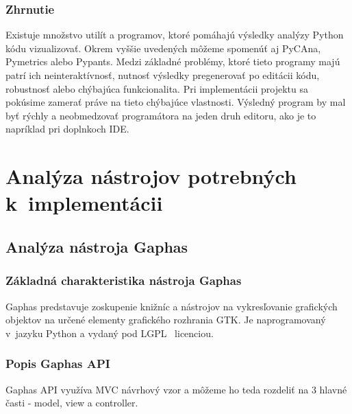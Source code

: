 \documentclass[11pt,oneside,final]{fithesis2}
\begin{document}
	\subsection{Zhrnutie}
	
	Existuje množstvo utilít a programov, ktoré pomáhajú výsledky analýzy Python kódu vizualizovať. Okrem vyššie uvedených môžeme spomenúť aj PyCAna, Pymetrics alebo Pypants. Medzi základné problémy, ktoré tieto programy majú patrí ich neinteraktívnosť, nutnosť výsledky pregenerovať po editácii kódu, robustnosť alebo chýbajúca funkcionalita. Pri implementácii projektu sa pokúsime zamerať práve na tieto chýbajúce vlastnosti. Výsledný program by mal byť rýchly a neobmedzovať programátora na jeden druh editoru, ako je to napríklad pri doplnkoch IDE.
	
    
\chapter{Analýza nástrojov potrebných k~implementácii}

	\section{Analýza nástroja Gaphas}

	\subsection{Základná charakteristika nástroja Gaphas}

		Gaphas predstavuje zoskupenie knižníc a nástrojov na vykresľovanie grafických objektov na určené elementy grafického rozhrania GTK. Je naprogramovaný v~jazyku Python a vydaný pod LGPL~\cite{lgpl} licenciou.

	\subsection{Popis Gaphas API}

Gaphas API využíva MVC návrhový vzor a môžeme ho teda rozdeliť na 3 hlavné časti - model, view a controller.
\end{document}
